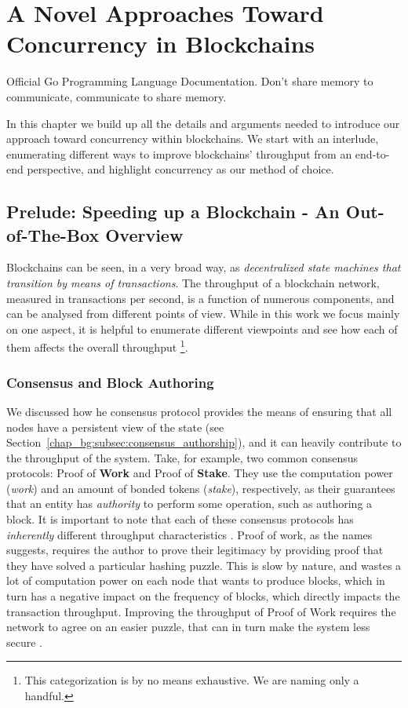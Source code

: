 \chapter{A Novel Approaches Toward Concurrency in Blockchains} \label{chap:approach}

\begin{chapquote}{Official Go Programming Language Documentation.}
	Don't share memory to communicate, communicate to share memory.
\end{chapquote}

In this chapter we build up all the details and arguments needed to introduce our approach toward concurrency within blockchains. We start with an interlude, enumerating different ways to improve blockchains' throughput from an end-to-end perspective, and highlight concurrency as our method of choice.

\section{Prelude: Speeding up a Blockchain - An Out-of-The-Box
Overview}\label{chap_approach:sec:ways_to_speedup}

Blockchains can be seen, in a very broad way, as \textit{decentralized state machines
that transition by means of transactions}. The throughput of a blockchain network, measured in transactions per second, is a function of numerous components, and can be analysed from different points of view. While in this work we focus mainly on one aspect, it is helpful to enumerate different viewpoints and see how each of them affects the overall throughput \footnote{This
categorization is by no means exhaustive. We are naming only a handful.}.

\subsection{Consensus and Block Authoring}
We discussed how he consensus protocol provides the means of ensuring that all nodes have a persistent
view of the state (see Section~\ref{chap_bg:subsec:consensus_authorship}), and it can heavily contribute to the throughput of the system. Take, for example, two
common consensus protocols: Proof of \textbf{Work} and Proof of \textbf{Stake}. They use the computation power (\textit{work}) and an amount of bonded tokens (\textit{stake}), respectively, as
their guarantees that an entity has \textit{authority} to perform some operation, such as authoring
a block. It is important to note that each of these consensus protocols has  \textit{inherently}
different throughput characteristics \cite{meneghettiSurveyEfficientParallelization2019}. Proof of
work, as the names suggests, requires the author to prove their legitimacy by providing proof that
they have solved a particular hashing puzzle. This is slow by nature, and wastes a lot of
computation power on each node that wants to produce blocks, which in turn has a negative impact on
the frequency of blocks, which directly impacts the transaction throughput. Improving the throughput of Proof of Work
requires the network to agree on an easier puzzle, that can in turn make the system less secure
\cite{gervaisSecurityPerformanceProof2016}.

